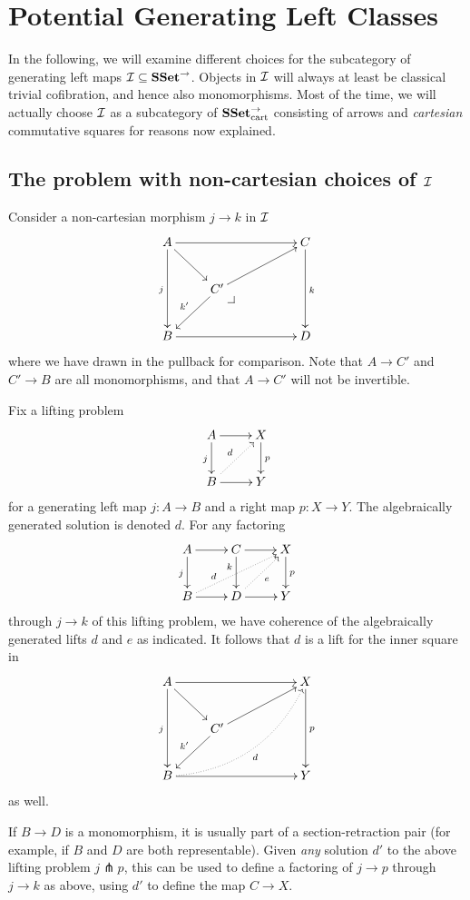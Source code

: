 \documentclass[reqno,10pt,a4paper,oneside]{amsart}
\begin{document}
\section*{Potential Generating Left Classes}

In the following, we will examine different choices for the subcategory of generating left maps $\cal{I} \subseteq \SSet^{\to}$.
Objects in $\cal{I}$ will always at least be classical trivial cofibration, and hence also monomorphisms.
Most of the time, we will actually choose $\cal{I}$ as a subcategory of $\SSet_{\text{cart}}^{\to}$ consisting of arrows and \emph{cartesian} commutative squares for reasons now explained.

\subsection*{The problem with non-cartesian choices of $\cal{I}$}

Consider a non-cartesian morphism $j \to k$ in $\cal{I}$
\[
\xymatrix{
  A
  \ar[rrr]
  \ar[dd]_{j}
  \ar[dr]
&&&
  C
  \ar[dd]^{k}
\\&
  C'
  \ar[urr]
  \ar[dl]_{k'}
  \pullback{dr}
\\
  B
  \ar[rrr]
&&&
  D
}
\]
where we have drawn in the pullback for comparison.
Note that $A \to C'$ and $C' \to B$ are all monomorphisms, and that $A \to C'$ will not be invertible.

Fix a lifting problem
\[
\xymatrix{
  A
  \ar[r]
  \ar[d]_{j}
&
  X
  \ar[d]^{p}
\\
  B
  \ar[r]
  \ar@{.>}[ur]^{d}
&
  Y
}
\]
for a generating left map $j : A \to B$ and a right map $p : X \to Y$.
The algebraically generated solution is denoted $d$.
For any factoring
\[
\xymatrix{
  A
  \ar[r]
  \ar[d]_{j}
&
  C
  \ar[r]
  \ar[d]_(0.35){k}
&
  X
  \ar[d]^{p}
\\
  B
  \ar[r]
  \ar@{.>}[urr]^(0.3){d}
&
  D
  \ar[r]
  \ar@{.>}[ur]_{e}
&
  Y
}
\]
through $j \to k$ of this lifting problem, we have coherence of the algebraically generated lifts $d$ and $e$ as indicated.
It follows that $d$ is a lift for the inner square in
\[
\xymatrix{
  A
  \ar[rrr]
  \ar[dd]_{j}
  \ar[dr]
&&&
  X
  \ar[dd]^{p}
\\&
  C'
  \ar[urr]
  \ar[dl]_{k'}
\\
  B
  \ar[rrr]
  \ar@{.>}@/_2em/[uurrr]_{d}
&&&
  Y
}
\]
as well.

If $B \to D$ is a monomorphism, it is usually part of a section-retraction pair (for example, if $B$ and $D$ are both representable).
Given \emph{any} solution $d'$ to the above lifting problem $j \pitchfork p$, this can be used to define a factoring of $j \to p$ through $j \to k$ as above, using $d'$ to define the map $C \to X$.
\end{document}

